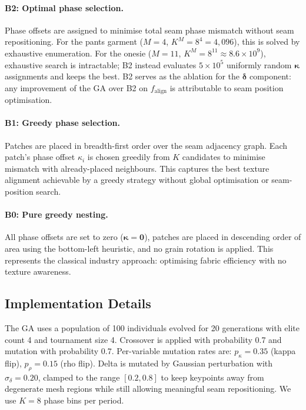 \paragraph{B2: Optimal phase selection.}
Phase offsets are assigned to minimise total seam phase mismatch without
seam repositioning.
For the pants garment ($M=4$, $K^M = 8^4 = 4{,}096$), this is solved by
exhaustive enumeration.
For the onesie ($M=11$, $K^M = 8^{11} \approx 8.6 \times 10^9$),
exhaustive search is intractable; B2 instead evaluates $5 \times 10^5$
uniformly random $\boldsymbol{\kappa}$ assignments and keeps the best.
B2 serves as the ablation for the $\boldsymbol{\delta}$ component: any
improvement of the GA over B2 on $f_\text{align}$ is attributable to seam
position optimisation.

\paragraph{B1: Greedy phase selection.}
Patches are placed in breadth-first order over the seam adjacency graph.
Each patch's phase offset $\kappa_i$ is chosen greedily from $K$ candidates
to minimise mismatch with already-placed neighbours.
This captures the best texture alignment achievable by a greedy strategy
without global optimisation or seam-position search.

\paragraph{B0: Pure greedy nesting.}
All phase offsets are set to zero ($\boldsymbol{\kappa} = \mathbf{0}$),
patches are placed in descending order of area using the bottom-left heuristic,
and no grain rotation is applied.
This represents the classical industry approach: optimising fabric efficiency
with no texture awareness.

\subsection{Implementation Details}
\label{sec:implementation}

The GA uses a population of 100 individuals evolved for 20 generations with
elite count 4 and tournament size 4.
Crossover is applied with probability 0.7 and mutation with probability 0.7.
Per-variable mutation rates are: $p_\kappa = 0.35$ (kappa flip),
$p_\rho = 0.15$ (rho flip).
Delta is mutated by Gaussian perturbation with $\sigma_\delta = 0.20$,
clamped to the range $[0.2, 0.8]$ to keep keypoints away from degenerate
mesh regions while still allowing meaningful seam repositioning.
We use $K=8$ phase bins per period.

